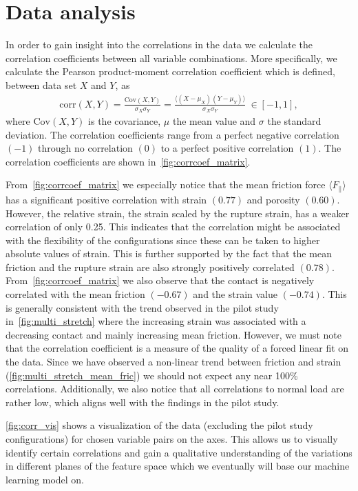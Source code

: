 \section{Data analysis}\label{sec:data_analysis}
In order to gain insight into the correlations in the data we calculate the correlation coefficients between all variable combinations. More specifically, we calculate the Pearson product-moment correlation coefficient which is defined, between data set $X$ and $Y$, as
\begin{align}
  \mathrm{corr}(X,Y) = \frac{\mathrm{Cov}(X,Y)}{\sigma_X \sigma_Y} = \frac{\langle (X - \mu_X)(Y - \mu_Y)\rangle}{\sigma_X \sigma_Y} \ \in [-1, 1],
  \label{eq:pearson}
\end{align}
where $\mathrm{Cov}(X,Y)$ is the covariance, $\mu$ the mean value and $\sigma$ the standard deviation. The correlation coefficients range from a perfect negative correlation $(-1)$ through no correlation $(0)$ to a perfect positive correlation $(1)$. The correlation coefficients are shown in~\cref{fig:corrcoef_matrix}.


From~\cref{fig:corrcoef_matrix} we especially notice that the mean friction
force $\langle F_{\parallel} \rangle$ has a significant positive correlation
with strain $(0.77)$ and porosity $(0.60)$. However, the relative strain, the
strain scaled by the rupture strain, has a weaker correlation of only 0.25.
This indicates that the correlation might be associated with the flexibility of
the configurations since these can be taken to higher absolute values of strain.
This is further supported by the fact that the mean friction and the rupture
strain are also strongly positively correlated $(0.78)$. From~\cref{fig:corrcoef_matrix} we also observe that the contact is negatively
correlated with the mean friction $(-0.67)$ and the strain value $(-0.74)$. This is generally consistent with the trend observed in the pilot study in~\cref{fig:multi_stretch} where the increasing strain was associated with a decreasing contact and mainly increasing mean friction. However, we must note that the correlation coefficient is a measure of the quality of a forced linear fit on the data. Since we have observed a non-linear trend between friction and strain (\cref{fig:multi_stretch_mean_fric}) we should not expect any near 100\% correlations. Additionally, we also notice that all correlations to normal load are rather low, which aligns well with the findings in the pilot study. 

\cref{fig:corr_vis} shows a visualization of the data (excluding
the pilot study configurations) for chosen variable pairs on the axes. This allows us to visually identify certain correlations and gain a qualitative understanding of the variations in different planes of the feature space which we eventually will base our machine learning model on. 

